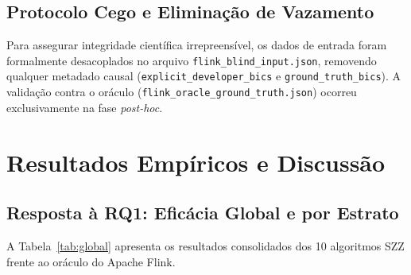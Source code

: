 \documentclass[10pt,journal,compsoc]{IEEEtran}
\begin{document}
\subsection{Protocolo Cego e Eliminação de Vazamento}
Para assegurar integridade científica irrepreensível, os dados de entrada foram formalmente desacoplados no arquivo \texttt{flink\_blind\_input.json}, removendo qualquer metadado causal (\texttt{explicit\_developer\_bics} e \texttt{ground\_truth\_bics}). A validação contra o oráculo (\texttt{flink\_oracle\_ground\_truth.json}) ocorreu exclusivamente na fase \textit{post-hoc}.

\section{Resultados Empíricos e Discussão}

\subsection{Resposta à RQ1: Eficácia Global e por Estrato}
A Tabela~\ref{tab:global} apresenta os resultados consolidados dos 10 algoritmos SZZ frente ao oráculo do Apache Flink.
\end{document}
